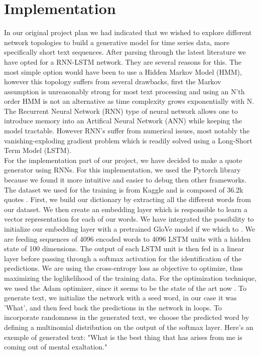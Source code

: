 


\section{Implementation}
In our original project plan we had indicated that we wished to explore 
different network topologies to build a generative model for time series 
data, more specifically short text sequences. After parsing through the latest
literature we have opted for a RNN-LSTM network. They are several reasons for
this. The most simple option would have been to use a Hidden Markov Model
(HMM), however this topology suffers from several drawbacks, first the 
Markov assumption is unreasonably strong for most text processing and 
using an N'th order HMM is not an alternative as time complexity grows 
exponentially with N. The Recurrent Neural Network (RNN) type of neural
network allows one to introduce memory into an Artifical Neural Network (ANN)
while keeping the model tractable. However RNN's suffer from numerical issues,
most notably the vanishing-exploding gradient problem which is readily solved
using a Long-Short Term Model (LSTM). \\

For the implementation part of our project, we have decided to make a quote
generator using RNNs. For this implementation, we used the Pytorch library
because we found it more intuitive and easier to debug then other frameworks.
The dataset we used for the training is from Kaggle and is composed of 36.2k
quotes \cite{quote}. First, we build our dictionary by extracting all the
different words from our dataset. We then create an embedding layer which is
responsible to learn a vector representation for each of our words. We have
integrated the possibility to initialize our embedding layer with a pretrained
GloVe model if we which to \cite{glove}. We are feeding sequences of 4096
encoded words to 4096 LSTM units with a hidden state of 100 dimensions. The
output of each LSTM unit is then fed in a linear layer before passing through a
softmax activation for the identification of the predictions. We are using the
cross-entropy loss as objective to optimize, thus maximizing the loglikelihood
of the training data. For the optimization technique, we used the Adam
optimizer, since it seems to be the state of the art now \cite{adam}. To
generate text, we initialize the network with a seed word, in our case it was
'What', and then feed back the predictions in the network in loops. To
incorporate randomness in the generated text, we choose the predicted word by
defining a multinomial distribution on the output of the softmax layer. Here's
an exemple of generated text: "What is the best thing that has arises from me
is coming out of mental exaltation."    

\clearpage

 

